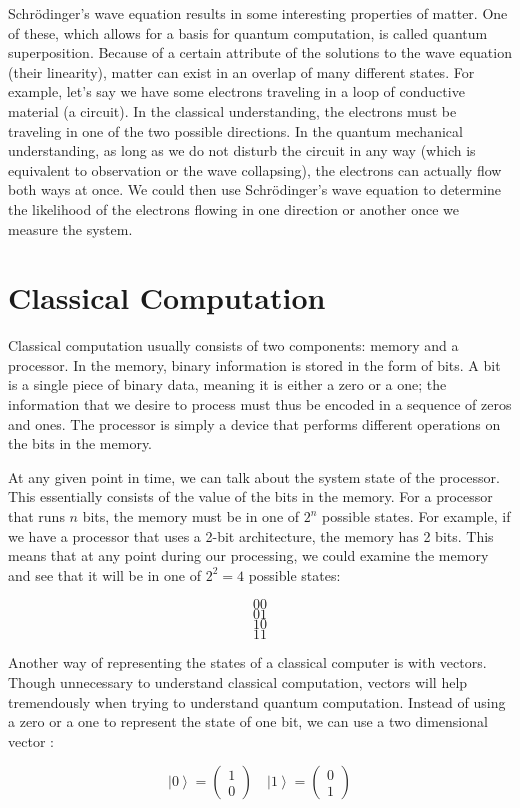 \documentclass[11pt]{report}
\newcommand{\?}{\stackrel{?}{=}}
\begin{document}
Schrödinger's wave equation results in some interesting properties of matter. One of these, which allows for a basis for quantum computation, is called quantum superposition. Because of a certain attribute of the solutions to the wave equation (their linearity), matter can exist in an overlap of many different states. For example, let's say we have some electrons traveling in a loop of conductive material (a circuit). In the classical understanding, the electrons must be traveling in one of the two possible directions. In the quantum mechanical understanding, as long as we do not disturb the circuit in any way (which is equivalent to observation or the wave collapsing), the electrons can actually flow both ways at once. We could then use Schrödinger's wave equation to determine the likelihood of the electrons flowing in one direction or another once we measure the system.

\section{Classical Computation}
Classical computation usually consists of two components: memory and a processor. In the memory, binary information is stored in the form of bits. A bit is a single piece of binary data, meaning it is either a zero or a one; the information that we desire to process must thus be encoded in a sequence of zeros and ones. The processor is simply a device that performs different operations on the bits in the memory.

At any given point in time, we can talk about the system state of the processor. This essentially consists of the value of the bits in the memory. For a processor that runs $n$ bits, the memory must be in one of $2^n$ possible states. For example, if we have a processor that uses a 2-bit architecture, the memory has 2 bits. This means that at any point during our processing, we could examine the memory and see that it will be in one of $2^2=4$ possible states:

$$00$$
$$01$$
$$10$$
$$11$$

Another way of representing the states of a classical computer is with vectors. Though unnecessary to understand classical computation, vectors will help tremendously when trying to understand quantum computation. Instead of using a zero or a one to represent the state of one bit, we can use a two dimensional vector :

$$\left | 0 \right \rangle=\begin{pmatrix}1\\ 0\end{pmatrix} \quad \left | 1 \right \rangle=\begin{pmatrix}0\\ 1\end{pmatrix}$$
             
\end{document}
